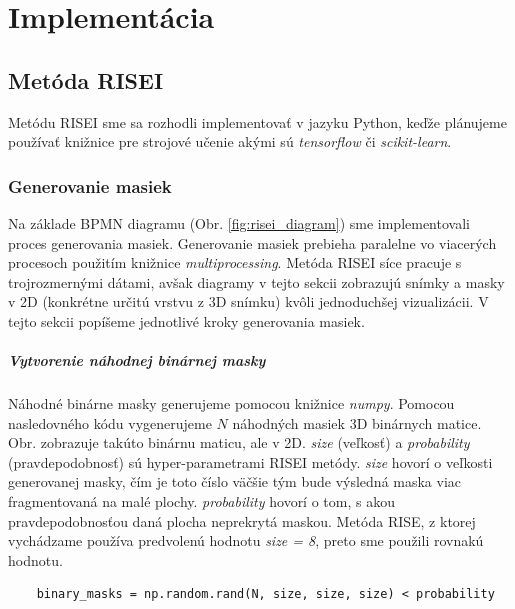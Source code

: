 \chapter{Implementácia}

\section{Metóda RISEI}

Metódu RISEI sme sa rozhodli implementovať v jazyku Python, keďže plánujeme používať knižnice pre strojové učenie akými sú \textit{tensorflow} či \textit{scikit-learn}.

\subsection{Generovanie masiek}

Na základe BPMN diagramu (Obr. \ref{fig:risei_diagram}) sme implementovali proces generovania masiek. Generovanie masiek prebieha paralelne vo viacerých procesoch použitím knižnice \textit{multiprocessing}. Metóda RISEI síce pracuje s trojrozmernými dátami, avšak diagramy v tejto sekcii zobrazujú snímky a masky v 2D (konkrétne určitú vrstvu z 3D snímku) kvôli jednoduchšej vizualizácii. V tejto sekcii popíšeme jednotlivé kroky generovania masiek.

\paragraph{Vytvorenie náhodnej binárnej masky}

Náhodné binárne masky generujeme pomocou knižnice \textit{numpy}. Pomocou nasledovného kódu vygenerujeme $N$ náhodných masiek 3D binárnych matice. Obr. \label{fig:binary_mask} zobrazuje takúto binárnu maticu, ale v 2D. \textit{size} (veľkosť) a \textit{probability} (pravdepodobnosť) sú hyper-parametrami RISEI metódy. \textit{size} hovorí o veľkosti generovanej masky, čím je toto číslo väčšie tým bude výsledná maska viac fragmentovaná na malé plochy. \textit{probability} hovorí o tom, s akou pravdepodobnosťou daná plocha neprekrytá maskou. Metóda RISE, z ktorej vychádzame používa predvolenú hodnotu \textit{size = 8}, preto sme použili rovnakú hodnotu.

\begin{lstlisting}
    binary_masks = np.random.rand(N, size, size, size) < probability
\end{lstlisting}


